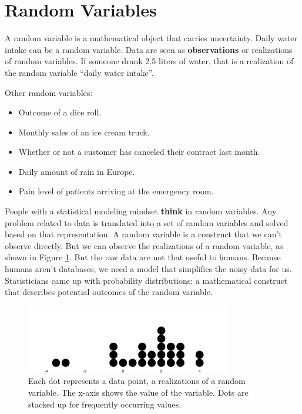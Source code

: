 \documentclass[
  10pt,
]{scrbook}
\providecommand{\tightlist}{%
  \setlength{\itemsep}{0pt}\setlength{\parskip}{0pt}}
\begin{document}
\hypertarget{random-variables}{%
\section{Random Variables}\label{random-variables}}

A random variable is a mathematical object that carries uncertainty.
Daily water intake can be a random variable.
Data are seen as \textbf{observations} or realizations of random variables.
If someone drank 2.5 liters of water, that is a realization of the random variable ``daily water intake''.

Other random variables:

\begin{itemize}
\tightlist
\item
  Outcome of a dice roll.
\item
  Monthly sales of an ice cream truck.
\item
  Whether or not a customer has canceled their contract last month.
\item
  Daily amount of rain in Europe.
\item
  Pain level of patients arriving at the emergency room.
\end{itemize}

People with a statistical modeling mindset \textbf{think} in random variables.
Any problem related to data is translated into a set of random variables and solved based on that representation.
A random variable is a construct that we can't observe directly.
But we can observe the realizations of a random variable, as shown in Figure \ref{fig:variable}.
But the raw data are not that useful to humans.
Because humans aren't databases, we need a model that simplifies the noisy data for us.
Statisticians came up with probability distributions: a mathematical construct that describes potential outcomes of the random variable.

\begin{figure}

{\centering \includegraphics[width=0.8\textwidth]{figures/variable-1} 

}

\caption{Each dot represents a data point, a realizations of a random variable. The x-axis shows the value of the variable. Dots are stacked up for frequently occurring values. }\label{fig:variable}
\end{figure}
\end{document}
